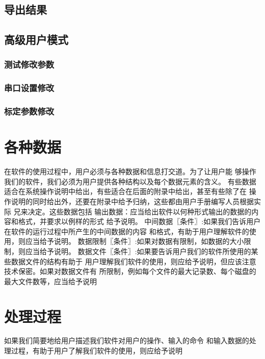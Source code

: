 \subsection{导出结果}
\subsection{高级用户模式\label{subsec:advancedUser}}
\subsubsection*{测试修改参数}
\subsubsection*{串口设置修改}
\subsubsection*{标定参数修改}
\section{各种数据}在软件的使用过程中，用户必须与各种数据和信息打交道。为了让用户能
够操作我们的软件，我们必须为用户提供各种结构以及每个数据元素的含义。
有些数据适合在系统操作说明中给出，有些适合在后面的附录中给出，甚至有些除了在
操作说明的同时给出外，还要在附录中给予归纳，这些都由用户手册编写人员根据实际
兄来决定。这些数据包括
输出数据：应当给出软件以何种形式输出的数据的内容和格式，并要求以例样的形式
给予说明。
中间数据〖条件〗:如果我们告诉用户在软件的运行过程中所产生的中间数据的内容
和格式，有助于用户理解软件的使用，则应当给予说明。
数据限制〖条件〗:如果对数据有限制，如数据的大小限制，则应当给予说明。
数据文件〖条件〗:如果要告诉用户我们的软件所使用的某些数据文件的结构有助于
用户理解我们软件的使用，则应给予说明，但应该注意技术保密。如果对数据文件有
所限制，例如每个文件的最大记录数、每个磁盘的最大文件数等，应当给予说明
\section{处理过程}
如果我们简要地给用户描述我们软件对用户的操作、输入的命令
和输入数据的处理过程，有助于用户了解我们软件的使用，则应给予说明
